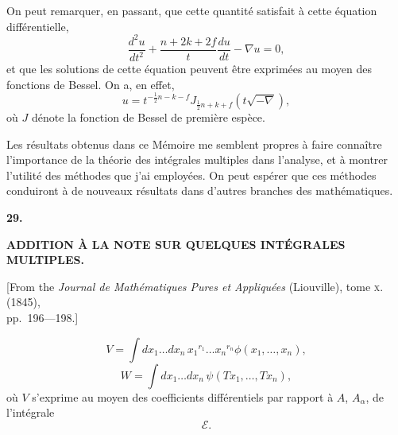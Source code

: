 \documentclass[11pt,a4paper]{article}
\begin{document}
On peut remarquer, en passant, que cette quantit\'{e} satisfait \`{a} cette \'{e}quation diff\'{e}rentielle,
\[
\frac{d^{2}u}{dt^{2}} + \frac{n+2k+2f}{t} \frac{du}{dt} - \nabla u = 0,
\]
et que les solutions de cette \'{e}quation peuvent \^{e}tre exprim\'{e}es au moyen des fonctions de
Bessel. On a, en effet,
\[
u = t^{-\frac{1}{2}n-k-f} J_{\frac{1}{2}n+k+f}(t\sqrt{-\nabla}),
\]
o\`{u} $J$ d\'{e}note la fonction de Bessel de premi\`{e}re esp\`{e}ce.

\newpage
\setcounter{page}{206}

Les r\'{e}sultats obtenus dans ce M\'{e}moire me semblent propres \`{a} faire conna\^{i}tre
l'importance de la th\'{e}orie des int\'{e}grales multiples dans l'analyse, et \`{a} montrer l'utilit\'{e}
des m\'{e}thodes que j'ai employ\'{e}es. On peut esp\'{e}rer que ces m\'{e}thodes conduiront \`{a} de
nouveaux r\'{e}sultats dans d'autres branches des math\'{e}matiques.


\newpage
{}
\setcounter{page}{206}

\begin{center}
{\large\bfseries 29.}
\end{center}
\vspace{0.5em}
\begin{center}
{\large\bfseries ADDITION \`{A} LA NOTE SUR QUELQUES INT\'{E}GRALES MULTIPLES.}
\end{center}
\vspace{0.5em}
\begin{center}
{[From the \textit{Journal de Math\'{e}matiques Pures et Appliqu\'{e}es} (Liouville), tome \textsc{x}. (1845),\\
pp.~196---198.]}
\end{center}
\vspace{1em}

\[
V = \int dx_1 \ldots dx_n \, x_1{}^{r_1} \ldots x_n{}^{r_n} \phi(x_1, \ldots, x_n),
\]
\[
W = \int dx_1 \ldots dx_n \, \psi(Tx_1, \ldots, Tx_n),
\]
o\`{u} $V$ s'exprime au moyen des coefficients diff\'{e}rentiels par rapport \`{a} $A$, $A_\alpha$, de l'int\'{e}grale
\[
\mathcal{E}.
\]

\end{document}
